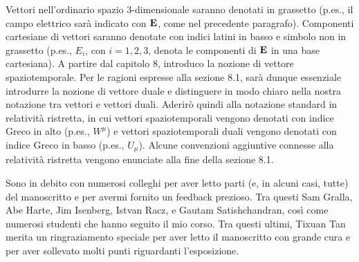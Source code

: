 Vettori nell'ordinario spazio $3$-dimensionale saranno denotati in grassetto (p.es., il campo elettrico sarà indicato con $\vb{E}$, come nel precedente paragrafo). Componenti cartesiane di vettori saranno denotate con indici latini in basso e simbolo non in grassetto  (p.es., $E_i$, con $i=1,2,3$, denota le componenti di $\vb{E}$ in una base cartesiana). A partire dal capitolo 8, introduco la nozione di vettore spaziotemporale. Per le ragioni espresse alla sezione 8.1, sarà dunque essenziale introdurre la nozione di vettore duale e distinguere in modo chiaro nella nostra notazione tra vettori e vettori duali. Aderirò quindi alla notazione standard in relatività ristretta, in cui  vettori spaziotemporali vengono denotati con indice Greco in alto (p.es., $W^{\mu}$) e vettori spaziotemporali duali     
vengono denotati con indice Greco in basso (p.es., $U_{\mu}$). Alcune convenzioni aggiuntive connesse alla relatività ristretta vengono enunciate alla fine della sezione 8.1.

Sono in debito con numerosi colleghi per aver letto parti (e, in alcuni casi, tutte) del manoscritto e per avermi fornito un feedback prezioso. Tra questi Sam Gralla, Abe Harte, Jim Isenberg, Istvan Racz, e Gautam Satishchandran, così come numerosi studenti che hanno seguito il mio corso. Tra questi ultimi, Tixuan Tan merita un ringraziamento speciale per aver letto il manoscritto con grande cura e per aver sollevato molti punti riguardanti l'esposizione. 

